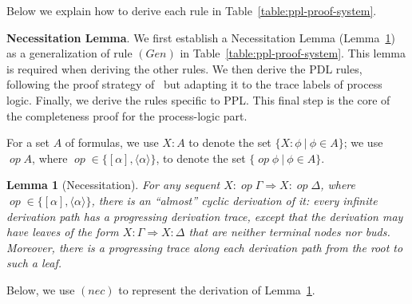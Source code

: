 \documentclass[manuscript,screen]{acmart}
\newtheorem{lemma}{Lemma}[section]
\newcommand{\la}[0]{\langle}
\newcommand{\ra}[0]{\rangle}
\newcommand{\dddef}[0]{=_{df}}
\DeclareMathOperator{\op}{\mathit{op}}
\newcommand{\PPL}[0]{\mbox{PPL}}
\begin{document}
Below we explain how to derive each rule in Table~\ref{table:ppl-proof-system}.  

\textbf{Necessitation Lemma}. 
We first establish a Necessitation Lemma (Lemma~\ref{lemma:Necessitation}) as a generalization of rule $(\textit{Gen})$ in Table~\ref{table:ppl-proof-system}.
This lemma is required when deriving the other rules. We then derive the PDL rules, following the proof strategy of~\cite{Docherty19} but adapting it to the trace labels of process logic. Finally, we derive the rules specific to \PPL. This final step is the core of the completeness proof for the process-logic part. 


For a set $A$ of formulas, we use $X : A$ to denote the set $\{X : \phi\ |\ \phi\in A\}$; we use $\op A$, where $\op\in \{[\alpha],\la\alpha\ra\}$, to denote the set $\{\op\phi\ |\ \phi\in A\}$. 

\begin{lemma}[Necessitation]
    \label{lemma:Necessitation}
For any sequent $X:\op\Gamma\Rightarrow X:\op\Delta$, where $\op\in \{[\alpha],\la\alpha\ra\}$, %
there is an ``almost'' cyclic derivation of it: every infinite derivation path has a progressing derivation trace, except that the derivation may have leaves of the form $X :\Gamma\Rightarrow X:\Delta$ that are neither terminal nodes nor buds. Moreover, there is a progressing trace along each derivation path from the root to such a leaf. 
\end{lemma}

Below, we use $(nec)$ to represent the derivation of Lemma~\ref{lemma:Necessitation}. 
\end{document}
